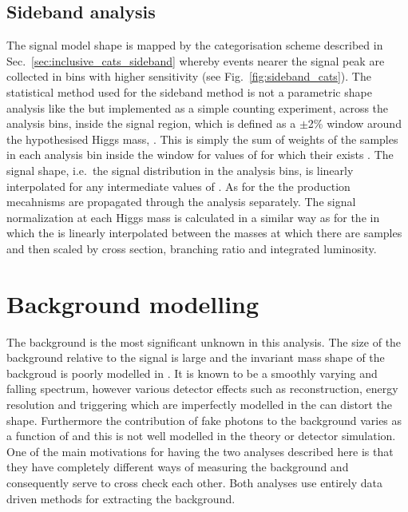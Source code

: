 \subsection{Sideband analysis}
\label{sec:sig_sideband}

The signal model shape is mapped by the categorisation scheme described in Sec.~\ref{sec:inclusive_cats_sideband} whereby events nearer the signal peak are collected in bins with higher sensitivity (see Fig.~\ref{fig:sideband_cats}). The statistical method used for the sideband method is not a parametric shape analysis like the \MFM but implemented as a simple counting experiment, across the analysis bins, inside the signal region, which is defined as a $\pm$2\% window around the hypothesised Higgs mass, \mH. This is simply the sum of weights of the \MC samples in each analysis bin inside the window for values of \mH for which their exists \MC. The signal shape, i.e.~the signal distribution in the analysis bins, is linearly interpolated for any intermediate values of \mH. As for the \MFM the \SM production mecahnisms are propagated through the analysis separately. The signal normalization at each Higgs mass is calculated in a similar way as for the \MFM in which the \ea is linearly interpolated between the masses at which there are \MC samples and then scaled by cross section, branching ratio and integrated luminosity. 

\section{Background modelling}
\label{sec:background_model}

The background is the most significant unknown in this analysis. The size of the background relative to the signal is large and the invariant mass shape of the backgroud is poorly modelled in \MC. It is known to be a smoothly varying and falling spectrum, however various detector effects such as reconstruction, energy resolution and triggering which are imperfectly modelled in the \MC can distort the shape. Furthermore the contribution of fake photons to the background varies as a function of \mgg and this is not well modelled in the theory or detector simulation. One of the main motivations for having the two analyses described here is that they have completely different ways of measuring the background and consequently serve to cross check each other. Both analyses use entirely data driven methods for extracting the background.  


